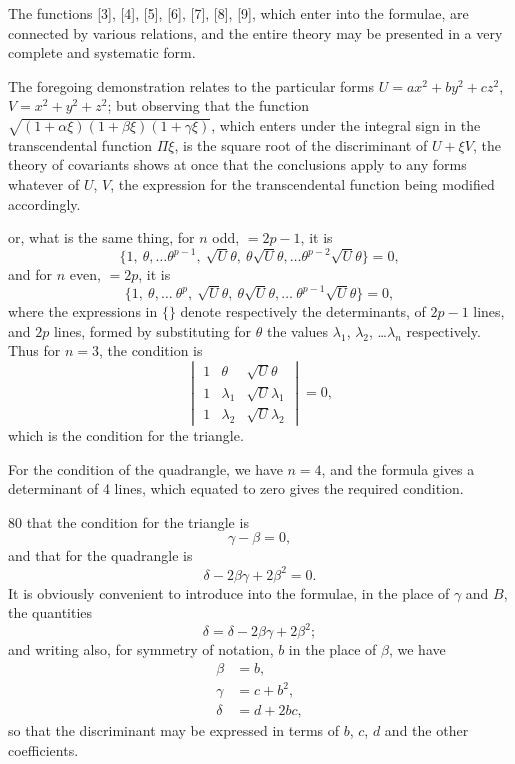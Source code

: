 \documentclass[11pt,a4paper]{book}
\begin{document}
The functions [3], [4], [5], [6], [7], [8], [9], which enter into the formulae, are connected by various relations, and the entire theory may be presented in a very complete and systematic form.

\newpage
\setcounter{page}{318}

The foregoing demonstration relates to the particular forms $U=ax^2+by^2+cz^2$, $V=x^2+y^2+z^2$; but observing that the function $\sqrt{(1+\alpha\xi)(1+\beta\xi)(1+\gamma\xi)}$, which enters under the integral sign in the transcendental function $\Pi\xi$, is the square root of the discriminant of $U+\xi V$, the theory of covariants shows at once that the conclusions apply to any forms whatever of $U$, $V$, the expression for the transcendental function being modified accordingly.

or, what is the same thing, for $n$ odd, $=2p-1$, it is
\[
\{1,\ \theta,\dots\theta^{p-1},\ \surd U\theta,\ \theta\surd U\theta,\dots\theta^{p-2}\surd U\theta\} = 0,
\]
and for $n$ even, $=2p$, it is
\[
\{1,\ \theta,\dots\ \theta^p,\ \surd U\theta,\ \theta\surd U\theta,\dots\ \theta^{p-1}\surd U\theta\} = 0,
\]
where the expressions in $\{\}$ denote respectively the determinants, of $2p-1$ lines, and $2p$ lines, formed by substituting for $\theta$ the values $\lambda_1$, $\lambda_2$, \dots$\lambda_n$ respectively. Thus for $n=3$, the condition is
\[
\begin{vmatrix}
1 & \theta & \surd U\theta \\
1 & \lambda_1 & \surd U\lambda_1 \\
1 & \lambda_2 & \surd U\lambda_2
\end{vmatrix} = 0,
\]
which is the condition for the triangle.

\newpage
\setcounter{page}{319}

For the condition of the quadrangle, we have $n=4$, and the formula gives a determinant of 4 lines, which equated to zero gives the required condition.

80 that the condition for the triangle is
\[
\gamma-\beta=0,
\]
and that for the quadrangle is
\[
\delta-2\beta\gamma+2\beta^2=0.
\]
It is obviously convenient to introduce into the formulae, in the place of $\gamma$ and $B$, the quantities
\[
\delta = \delta-2\beta\gamma+2\beta^2;
\]
and writing also, for symmetry of notation, $b$ in the place of $\beta$, we have
\begin{align*}
\beta &= b,\\
\gamma &= c+b^2,\\
\delta &= d+2bc,
\end{align*}
so that the discriminant may be expressed in terms of $b$, $c$, $d$ and the other coefficients.
\end{document}
